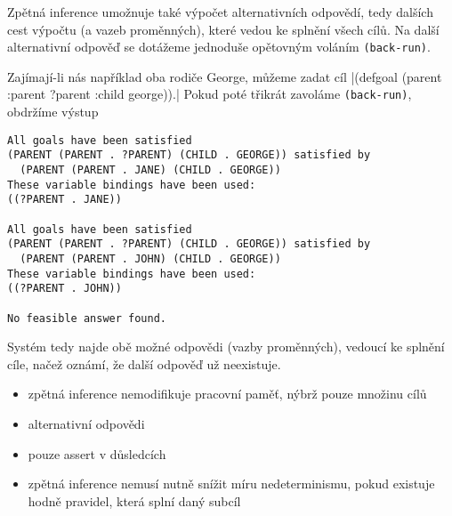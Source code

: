 Zpětná inference umožnuje také výpočet alternativních odpovědí, tedy dalších
cest výpočtu (a vazeb proměnných), které vedou ke splnění všech cílů. Na další
alternativní odpověď se dotážeme jednoduše opětovným voláním \verb|(back-run)|.

Zajímají-li nás například oba rodiče George, můžeme zadat cíl
\cl|(defgoal (parent :parent ?parent :child george)).|
Pokud poté třikrát zavoláme \verb|(back-run)|, obdržíme výstup
\begin{verbatim}
All goals have been satisfied
(PARENT (PARENT . ?PARENT) (CHILD . GEORGE)) satisfied by
  (PARENT (PARENT . JANE) (CHILD . GEORGE))
These variable bindings have been used:
((?PARENT . JANE))

All goals have been satisfied
(PARENT (PARENT . ?PARENT) (CHILD . GEORGE)) satisfied by
  (PARENT (PARENT . JOHN) (CHILD . GEORGE))
These variable bindings have been used:
((?PARENT . JOHN))

No feasible answer found.
\end{verbatim}
Systém tedy najde obě možné odpovědi (vazby proměnných), vedoucí ke splnění
cíle, načež oznámí, že další odpověď už neexistuje.

\begin{framed}
  \begin{itemize}
    \item zpětná inference nemodifikuje pracovní paměť, nýbrž pouze množinu cílů
    \item alternativní odpovědi
    \item pouze assert v důsledcích
    \item zpětná inference nemusí nutně snížit míru nedeterminismu, pokud
    existuje hodně pravidel, která splní daný subcíl
  \end{itemize}
\end{framed}
